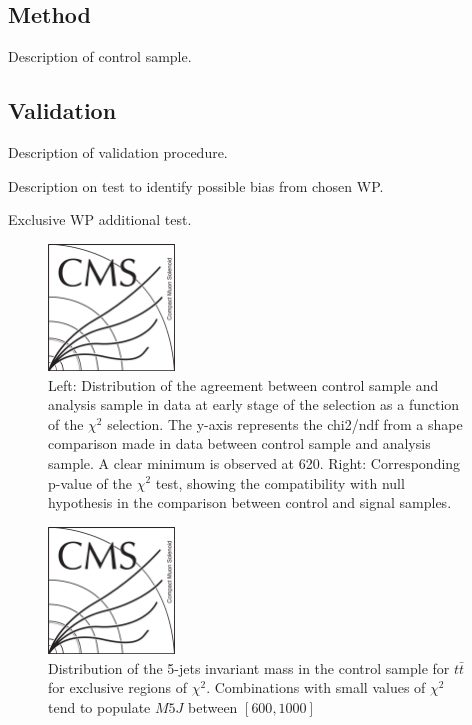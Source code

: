 
\subsection{Method}
\label{sec:bkgmet}

Description of control sample.

\subsection{Validation}
\label{sec:val}

Description of validation procedure.

Description on test to identify possible bias from chosen WP.

Exclusive WP additional test.

\begin{figure}[!Hhtbp]
  \begin{center}
    \includegraphics[width=0.3\textwidth]{figs/CMSlogo.png}
    \caption{Left: Distribution of the agreement between control sample and analysis sample in data at early stage of the selection as a function of the $\chi^2$ selection. The y-axis represents the chi2/ndf from a shape comparison made in data between control sample and analysis sample. A clear minimum is observed at 620. Right: Corresponding p-value of the $\chi^{2}$ test, showing the compatibility with null hypothesis in the comparison between control and signal samples.}
    \label{fig:optchi2}
  \end{center}
\end{figure}\clearpage

\begin{figure}[!Hhtbp]
  \begin{center}
    \includegraphics[width=0.3\textwidth]{figs/CMSlogo.png}
    \caption{Distribution of the 5-jets invariant mass in the control sample for $t\bar{t}$ for exclusive regions of $\chi^{2}$. Combinations with small values of $\chi^{2}$ tend to populate $M5J$ between $[600,1000]$}
    \label{fig:Chi2Regions}
  \end{center}
\end{figure}\clearpage

